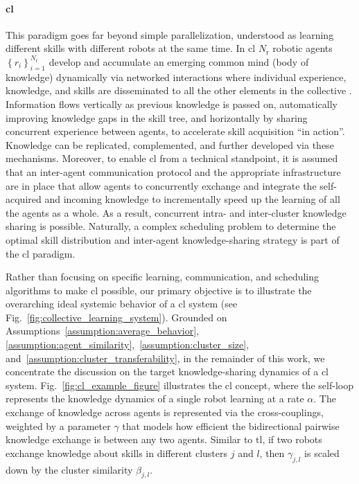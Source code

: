 \documentclass[12pt]{article}
\begin{document}

\paragraph*{\textbf{\Acl{cl}}}
This paradigm goes far beyond simple parallelization, understood as learning different skills with different robots at the same time. In \ac{cl} $N_\mathrm{r}$ robotic agents $ \left\lbrace r_i \right\rbrace_{i=1}^{N_\mathrm{r}} $ develop and accumulate an emerging common mind (body of knowledge) dynamically via networked interactions where individual experience, knowledge, and skills are disseminated to all the other elements in the collective \cite{Garavan2012CollectiveLearning}. Information flows vertically as previous knowledge is passed on, automatically improving knowledge gaps in the skill tree, and horizontally by sharing concurrent experience between agents, to accelerate skill acquisition ``in action''. Knowledge can be replicated, complemented, and further developed via these mechanisms. Moreover, to enable \ac{cl} from a technical standpoint, it is assumed that an inter-agent communication protocol and the appropriate infrastructure are in place that allow agents to concurrently exchange and integrate the self-acquired and incoming knowledge to incrementally speed up the learning of all the agents as a whole. As a result, concurrent intra- and inter-cluster knowledge sharing is possible. Naturally, a complex scheduling problem to determine the optimal skill distribution and inter-agent knowledge-sharing strategy is part of the \ac{cl} paradigm. 

Rather than focusing on specific learning, communication, and scheduling algorithms to make \ac{cl} possible, our primary objective is to illustrate the overarching ideal systemic behavior of a \acl{cl} system (see Fig.~\ref{fig:collective_learning_system}). Grounded on Assumptions~\ref{assumption:average_behavior}, \ref{assumption:agent_similarity},~\ref{assumption:cluster_size}, and~\ref{assumption:cluster_transferability}, in the remainder of this work, we concentrate the discussion on the target knowledge-sharing dynamics of a \ac{cl} system. Fig.~\ref{fig:cl_example_figure} illustrates the \ac{cl} concept, where the self-loop represents the knowledge dynamics of a single robot learning at a rate $\alpha$. The exchange of knowledge across agents is represented via the cross-couplings, weighted by a parameter $\gamma$ that models how efficient the bidirectional pairwise knowledge exchange is between any two agents. Similar to \ac{tl}, if two robots exchange knowledge about skills in different clusters $j$ and $l$, then $\gamma_{j,l}$ is scaled down by the cluster similarity $\beta_{j,l}$. 
\end{document}
